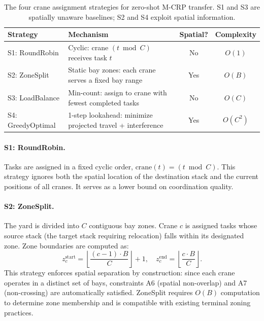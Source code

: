 \begin{table}[h!]
    \centering
    \caption{The four crane assignment strategies for zero-shot M-CRP transfer. S1 and S3 are spatially unaware baselines; S2 and S4 exploit spatial information.}
    \label{tab:strategies}
    \begin{tabularx}{\textwidth}{lXcc}
        \toprule
        Strategy & Mechanism & Spatial? & Complexity \\
        \midrule
        S1: RoundRobin & Cyclic: crane $(t \bmod C)$ receives task $t$ & No & $O(1)$ \\
        S2: ZoneSplit & Static bay zones: each crane serves a fixed bay range & Yes & $O(B)$ \\
        S3: LoadBalance & Min-count: assign to crane with fewest completed tasks & No & $O(C)$ \\
        S4: GreedyOptimal & 1-step lookahead: minimize projected travel + interference & Yes & $O(C^2)$ \\
        \bottomrule
    \end{tabularx}
\end{table}

\paragraph{S1: RoundRobin.} Tasks are assigned in a fixed cyclic order, $\text{crane}(t) = (t \bmod C)$. This strategy ignores both the spatial location of the destination stack and the current positions of all cranes. It serves as a lower bound on coordination quality.

\paragraph{S2: ZoneSplit.} The yard is divided into $C$ contiguous bay zones. Crane $c$ is assigned tasks whose source stack (the target stack requiring relocation) falls within its designated zone. Zone boundaries are computed as:
\begin{equation}
    z_c^{\text{start}} = \left\lfloor \frac{(c-1) \cdot B}{C} \right\rfloor + 1, \quad
    z_c^{\text{end}} = \left\lfloor \frac{c \cdot B}{C} \right\rfloor.
\end{equation}
This strategy enforces spatial separation by construction: since each crane operates in a distinct set of bays, constraints A6 (spatial non-overlap) and A7 (non-crossing) are automatically satisfied. ZoneSplit requires $O(B)$ computation to determine zone membership and is compatible with existing terminal zoning practices.

